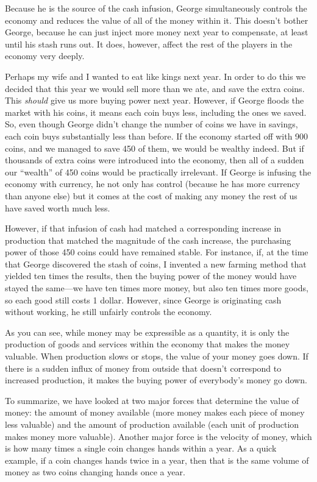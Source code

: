 Because he is the source of the cash infusion, George simultaneously 
controls the economy and reduces the value of all of the money within it.
This doesn't bother George, because he can just inject more money next year to compensate,
at least until his stash runs out.  It does, however, affect the rest of the 
players in the economy very deeply.

Perhaps my wife and I wanted to eat like kings next year.  In order to do this we
decided that this year we would sell more than we ate, and save the
extra coins. This \textit{should} give us more buying power next year. However, if
George floods the market with his coins, it means each coin buys less, including
the ones we saved.
So, even though George didn't change the number of coins we have in savings, each coin
buys substantially less than before. If the economy started off with 900 coins, and
we managed to save 450 of them, we would be wealthy indeed. But if
thousands of extra coins were introduced into the economy, then all of a
sudden our ``wealth'' of 450 coins would be practically irrelevant. If
George is infusing the economy with currency, he not only has control
(because he has more currency than anyone else) but it comes at the
cost of making any money the rest of us have saved worth much less. 

However, if that infusion of cash had matched a corresponding increase
in production that matched the magnitude of the cash increase, the
purchasing power of those 450 coins could have remained stable.  
For instance, if, at the time that George discovered the stash of coins,
I invented a new farming method that yielded ten times the results, then
the buying power of the money would have stayed the same---we have ten times
more money, but also ten times more goods, so each good still costs 1 dollar.  
However, since George is originating cash without working, he still unfairly
controls the economy.

As you can see, while money may be expressible as a quantity, it is only
the production of goods and services within the economy that makes
the money valuable. When production slows or stops, the value of your money
goes down. If there is a sudden influx of money from outside that doesn’t correspond
to increased production, it makes the buying power of everybody’s money go
down. 

To summarize, we have
looked at two major forces that determine the value of money: the
amount of money available (more money makes each piece of money less
valuable) and the amount of production available (each unit of
production makes money more valuable). Another major force is the
velocity of money, which is how many times a single coin changes hands
within a year. As a quick example, if a coin changes hands twice in a year, then that is
the same volume of money as two coins changing hands once a year.

